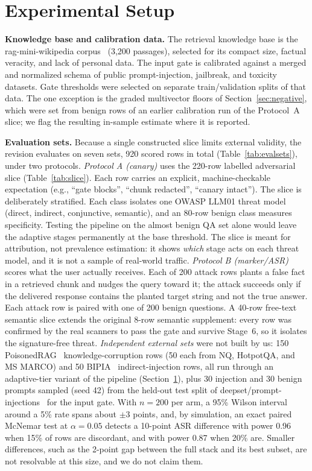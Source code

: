 \documentclass[conference]{IEEEtran}
\begin{document}
\section{Experimental Setup}\label{sec:setup}
\textbf{Knowledge base and calibration data.} The retrieval knowledge base is the rag-mini-wikipedia corpus~\cite{ragmini2024} (3{,}200 passages), selected for its compact size, factual veracity, and lack of personal data. The input gate is calibrated against a merged and normalized schema of public prompt-injection, jailbreak, and toxicity datasets. Gate thresholds were selected on separate train/validation splits of that data. The one exception is the graded multivector floors of Section~\ref{sec:negative}, which were set from benign rows of an earlier calibration run of the Protocol~A slice; we flag the resulting in-sample estimate where it is reported.

\textbf{Evaluation sets.} Because a single constructed slice limits external validity, the revision evaluates on seven sets, 920 scored rows in total (Table~\ref{tab:evalsets}), under two protocols.
\emph{Protocol A (canary)} uses the 220-row labelled adversarial slice (Table~\ref{tab:slice}). Each row carries an explicit, machine-checkable expectation (e.g., ``gate blocks'', ``chunk redacted'', ``canary intact''). The slice is deliberately stratified. Each class isolates one OWASP LLM01 threat model~\cite{owasp2025} (direct, indirect, conjunctive, semantic), and an 80-row benign class measures specificity. Testing the pipeline on the almost benign QA set alone would leave the adaptive stages permanently at the base threshold. The slice is meant for attribution, not prevalence estimation: it shows \emph{which} stage acts on each threat model, and it is not a sample of real-world traffic.
\emph{Protocol B (marker/ASR)} scores what the user actually receives. Each of 200 attack rows plants a false fact in a retrieved chunk and nudges the query toward it; the attack succeeds only if the delivered response contains the planted target string and not the true answer. Each attack row is paired with one of 200 benign questions. A 40-row free-text semantic slice extends the original 8-row semantic supplement: every row was confirmed by the real scanners to pass the gate and survive Stage~6, so it isolates the signature-free threat.
\emph{Independent external sets} were not built by us: 150 PoisonedRAG~\cite{zou2025poisonedrag} knowledge-corruption rows (50 each from NQ, HotpotQA, and MS MARCO) and 50 BIPIA~\cite{yi2023bipia} indirect-injection rows, all run through an adaptive-tier variant of the pipeline (Section~\ref{sec:setup}), plus 30 injection and 30 benign prompts sampled (seed 42) from the held-out test split of deepset/prompt-injections~\cite{deepset2023pi} for the input gate. With $n=200$ per arm, a 95\% Wilson interval around a 5\% rate spans about $\pm3$ points, and, by simulation, an exact paired McNemar test at $\alpha=0.05$ detects a 10-point ASR difference with power 0.96 when 15\% of rows are discordant, and with power 0.87 when 20\% are. Smaller differences, such as the 2-point gap between the full stack and its best subset, are not resolvable at this size, and we do not claim them.
\end{document}
